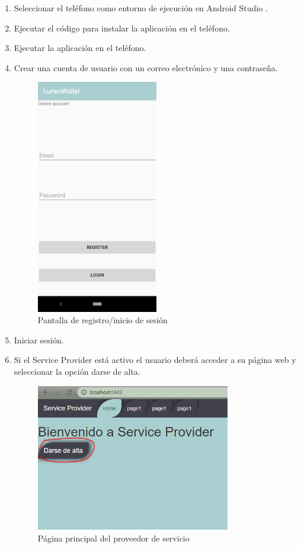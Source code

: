 \documentclass[12pt]{report}
\begin{document}
\begin{enumerate}
\item Seleccionar el teléfono como entorno de ejecución en Android Studio .
\item Ejecutar el código para instalar la aplicación en el teléfono.
\item Ejecutar la aplicación en el teléfono.
\item Crear una cuenta de usuario con un correo electrónico y una contraseña.
\begin{figure}[H]
\includegraphics[width=0.5\textwidth]{login-register}
\caption{Pantalla de registro/inicio de sesión}
\end{figure}

\item Iniciar sesión.
\item Si el Service Provider está activo el usuario deberá acceder a su página web y seleccionar la opción darse de alta.
\begin{figure}[H]
\includegraphics[width=0.8\textwidth]{service-provider}
\caption{Página principal del proveedor de servicio}
\end{figure}


\end{enumerate}
\end{document}
